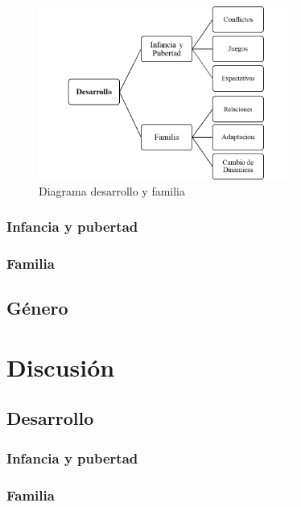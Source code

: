 \begin{figure}
    \centering
    \includegraphics[width=0.75\textwidth]{desarrollo}
    \caption{Diagrama desarrollo y familia}
    \label{fig:desarrollo}
\end{figure}

\subsubsection{Infancia y pubertad}

\subsubsection{Familia}

\subsection{Género}


\section{Discusión}\label{sec:discusion}

\subsection{Desarrollo}

\subsubsection{Infancia y pubertad}

\subsubsection{Familia}
